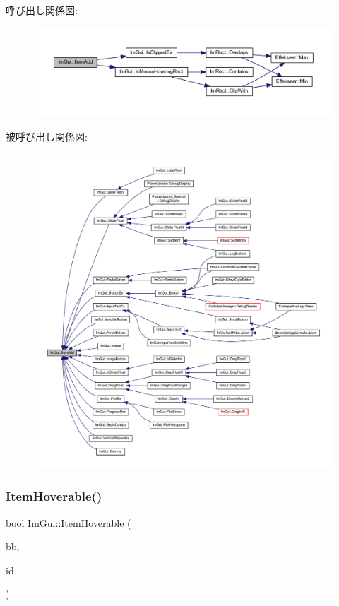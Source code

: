 呼び出し関係図\+:\nopagebreak
\begin{figure}[H]
\begin{center}
\leavevmode
\includegraphics[width=350pt]{namespace_im_gui_a454e81b7c3befcc51c900f2fb3bd5a9a_cgraph}
\end{center}
\end{figure}
被呼び出し関係図\+:\nopagebreak
\begin{figure}[H]
\begin{center}
\leavevmode
\includegraphics[width=350pt]{namespace_im_gui_a454e81b7c3befcc51c900f2fb3bd5a9a_icgraph}
\end{center}
\end{figure}
\mbox{\label{namespace_im_gui_a488b86a9f235923304186fb86ff64ffb}} 
\subsubsection{\texorpdfstring{Item\+Hoverable()}{ItemHoverable()}}
{\footnotesize\ttfamily bool Im\+Gui\+::\+Item\+Hoverable (\begin{DoxyParamCaption}\item[{const \mbox{\hyperlink{struct_im_rect}{Im\+Rect}} \&}]{bb,  }\item[{\mbox{\hyperlink{imgui_8h_a1785c9b6f4e16406764a85f32582236f}{Im\+Gui\+ID}}}]{id }\end{DoxyParamCaption})}



